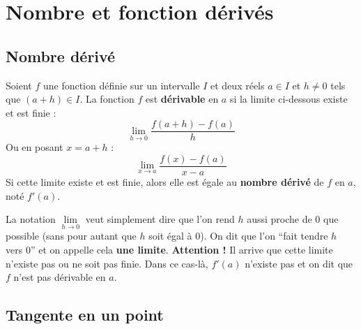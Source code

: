 






	\section{Nombre et fonction dérivés}

	\subsection{Nombre dérivé}

	\begin{formula}[Définition]
		Soient $f$ une fonction définie sur un intervalle $I$ et deux réels $a \in I$ et $h \neq 0$ tels que $(a + h) \in I$.
		\newpar
		La fonction $f$ est \textbf{dérivable} en $a$ si la limite ci-dessous existe et est finie :
		\[ \lim\limits_{h \rightarrow 0} \frac{f(a + h) - f(a)}{h} \]
		Ou en posant $x = a + h$ :
		\[ \lim\limits_{x \rightarrow a} \frac{f(x) - f(a)}{x-a} \]
		Si cette limite existe et est finie, alors elle est égale au \textbf{nombre dérivé} de $f$ en $a$, noté $f'(a)$.
	\end{formula}

	\begin{tip}
		La notation $\lim\limits_{h \rightarrow 0}$ veut simplement dire que l'on rend $h$ aussi proche de $0$ que possible (sans pour autant que $h$ soit égal à $0$). On dit que l'on ``fait tendre $h$ vers $0$'' et on appelle cela \textbf{une limite}.
		\newpar
		\textbf{Attention !} Il arrive que cette limite n'existe pas ou ne soit pas finie. Dans ce cas-là, $f'(a)$ n'existe pas et on dit que $f$ n'est pas dérivable en $a$.
	\end{tip}

	\subsection{Tangente en un point}

